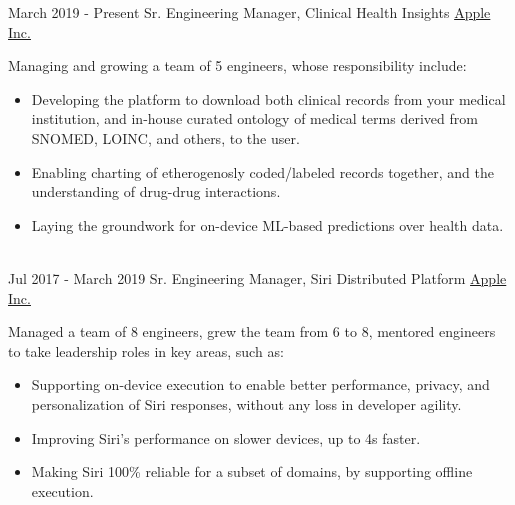 \documentclass[letterpaper]{twentysecondcv} %
\begin{document}
\makeprofile %


\vspace{0.3cm}

\begin{twenty} %
    \twentyitem
        {March 2019 -}
        {Present}
        {Sr. Engineering Manager, Clinical Health Insights}
        {\href{http://www.apple.com/}{Apple Inc.}}
        {Managing and growing a team of 5 engineers, whose responsibility include:
        {\begin{itemize}
        \item Developing the platform to download both clinical records from your medical institution, and in-house curated ontology of medical terms derived from SNOMED, LOINC, and others, to the user.
        \item Enabling charting of etherogenosly coded/labeled records together, and the understanding of drug-drug interactions.
        \item Laying the groundwork for on-device ML-based predictions over health data.
        \end{itemize}}
        }
        {}
     \\
    \twentyitem
        {Jul 2017 -}
        {March 2019}
        {Sr. Engineering Manager, Siri Distributed Platform}
        {\href{http://www.apple.com}{Apple Inc.}}
        {Managed a team of 8 engineers, grew the team from 6 to 8, mentored engineers to take leadership roles in key areas, such as:
        {\begin{itemize}
        \item Supporting on-device execution to enable better performance, privacy, and personalization of Siri responses, without any loss in developer agility.
        \item Improving Siri's performance on slower devices, up to 4s faster.
        \item Making Siri 100\% reliable for a subset of domains, by supporting offline execution.

\end{itemize}}}
\end{twenty}
\end{document}
